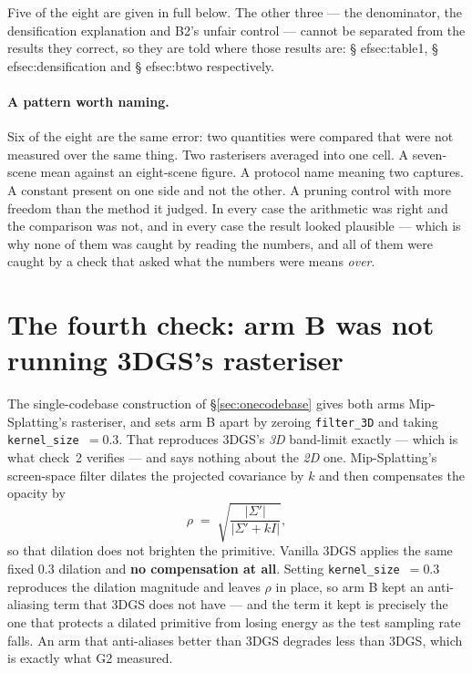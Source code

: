 \medskip
Five of the eight are given in full below. The other three --- the denominator,
the densification explanation and B2's unfair control --- cannot be separated
from the results they correct, so they are told where those results are:
\S
ef{sec:table1}, \S
ef{sec:densification} and \S
ef{sec:btwo}
respectively.

\paragraph{A pattern worth naming.} Six of the eight are the same error: two
quantities were compared that were not measured over the same thing. Two
rasterisers averaged into one cell. A seven-scene mean against an eight-scene
figure. A protocol name meaning two captures. A constant present on one side and
not the other. A pruning control with more freedom than the method it judged. In
every case the arithmetic was right and the comparison was not, and in every case
the result looked plausible --- which is why none of them was caught by reading
the numbers, and all of them were caught by a check that asked what the numbers
were means \emph{over}.

\section{The fourth check: arm B was not running 3DGS's rasteriser}

The single-codebase construction of \S\ref{sec:onecodebase} gives both arms
Mip-Splatting's rasteriser, and sets arm B apart by zeroing \texttt{filter\_3D}
and taking \texttt{kernel\_size}~$=0.3$. That reproduces 3DGS's \emph{3D}
band-limit exactly --- which is what check~2 verifies --- and says nothing about
the \emph{2D} one. Mip-Splatting's screen-space filter dilates the projected
covariance by $k$ and then compensates the opacity by
\begin{equation}
  \rho \;=\; \sqrt{\frac{\lvert\Sigma'\rvert}{\lvert\Sigma' + kI\rvert}} ,
\end{equation}
so that dilation does not brighten the primitive. Vanilla 3DGS applies the same
fixed $0.3$ dilation and \textbf{no compensation at all}. Setting
\texttt{kernel\_size}~$=0.3$ reproduces the dilation magnitude and leaves $\rho$
in place, so arm B kept an anti-aliasing term that 3DGS does not have --- and
the term it kept is precisely the one that protects a dilated primitive from
losing energy as the test sampling rate falls. An arm that anti-aliases better
than 3DGS degrades less than 3DGS, which is exactly what G2 measured.

